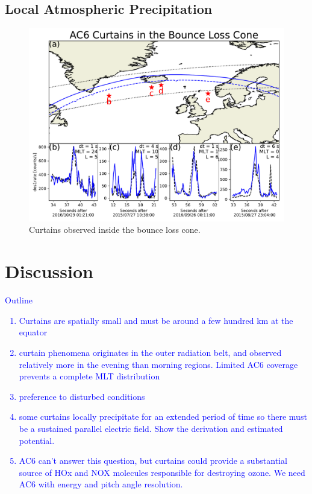 \documentclass[draft]{agujournal2019}
\begin{document}
\subsection{Local Atmospheric Precipitation}
\begin{figure}
\includegraphics[width=\textwidth]{fig3.pdf}
\caption{Curtains observed inside the bounce loss cone.}
\label{fig3}
\end{figure}

\section{Discussion} \label{discussion}
\textcolor{blue}{
Outline
\begin{enumerate}
\item Curtains are spatially small and must be around a few hundred km at the equator
\item curtain phenomena originates in the outer radiation belt, and observed relatively more in the evening than morning regions. Limited AC6 coverage prevents a complete MLT distribution
\item preference to disturbed conditions
\item some curtains locally precipitate for an extended period of time so there must be a sustained parallel electric field. Show the derivation and estimated potential.
\item AC6 can't answer this question, but curtains could provide a substantial source of HOx and NOX molecules responsible for destroying ozone. We need AC6 with energy and pitch angle resolution.
\end{enumerate}}
\end{document}
